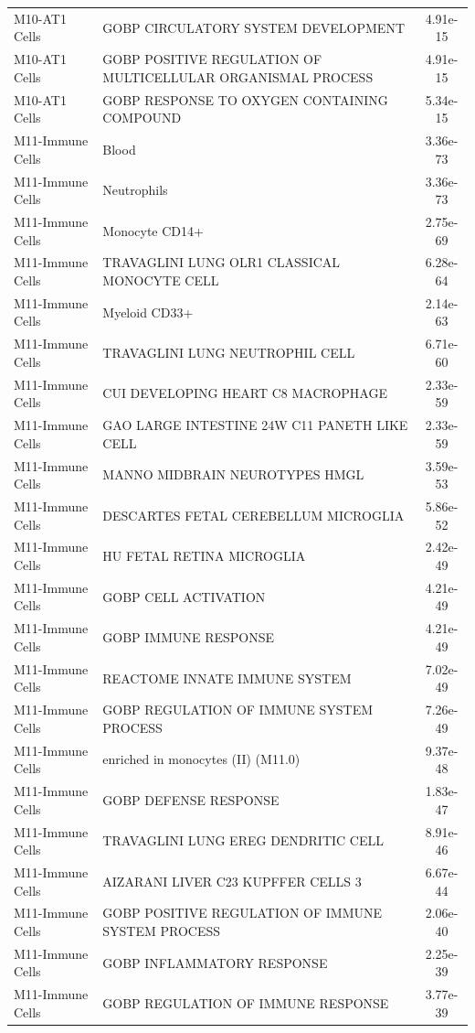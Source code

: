 \documentclass[
]{article}
\begin{document}
\begin{singlespace}
\begin{longtable}[t]{>{\raggedright\arraybackslash}p{1.4in}>{\raggedright\arraybackslash}p{4.5in}c}
M10-AT1 Cells & GOBP CIRCULATORY SYSTEM DEVELOPMENT & 4.91e-15\\
M10-AT1 Cells & GOBP POSITIVE REGULATION OF MULTICELLULAR ORGANISMAL PROCESS & 4.91e-15\\
M10-AT1 Cells & GOBP RESPONSE TO OXYGEN CONTAINING COMPOUND & 5.34e-15\\
\addlinespace
M11-Immune Cells & Blood & 3.36e-73\\
M11-Immune Cells & Neutrophils & 3.36e-73\\
M11-Immune Cells & Monocyte CD14+ & 2.75e-69\\
M11-Immune Cells & TRAVAGLINI LUNG OLR1 CLASSICAL MONOCYTE CELL & 6.28e-64\\
M11-Immune Cells & Myeloid CD33+ & 2.14e-63\\
\addlinespace
M11-Immune Cells & TRAVAGLINI LUNG NEUTROPHIL CELL & 6.71e-60\\
M11-Immune Cells & CUI DEVELOPING HEART C8 MACROPHAGE & 2.33e-59\\
M11-Immune Cells & GAO LARGE INTESTINE 24W C11 PANETH LIKE CELL & 2.33e-59\\
M11-Immune Cells & MANNO MIDBRAIN NEUROTYPES HMGL & 3.59e-53\\
M11-Immune Cells & DESCARTES FETAL CEREBELLUM MICROGLIA & 5.86e-52\\
\addlinespace
M11-Immune Cells & HU FETAL RETINA MICROGLIA & 2.42e-49\\
M11-Immune Cells & GOBP CELL ACTIVATION & 4.21e-49\\
M11-Immune Cells & GOBP IMMUNE RESPONSE & 4.21e-49\\
M11-Immune Cells & REACTOME INNATE IMMUNE SYSTEM & 7.02e-49\\
M11-Immune Cells & GOBP REGULATION OF IMMUNE SYSTEM PROCESS & 7.26e-49\\
\addlinespace
M11-Immune Cells & enriched in monocytes (II) (M11.0) & 9.37e-48\\
M11-Immune Cells & GOBP DEFENSE RESPONSE & 1.83e-47\\
M11-Immune Cells & TRAVAGLINI LUNG EREG DENDRITIC CELL & 8.91e-46\\
M11-Immune Cells & AIZARANI LIVER C23 KUPFFER CELLS 3 & 6.67e-44\\
M11-Immune Cells & GOBP POSITIVE REGULATION OF IMMUNE SYSTEM PROCESS & 2.06e-40\\
\addlinespace
M11-Immune Cells & GOBP INFLAMMATORY RESPONSE & 2.25e-39\\
M11-Immune Cells & GOBP REGULATION OF IMMUNE RESPONSE & 3.77e-39\\

\end{longtable}
\end{singlespace}
\end{document}
